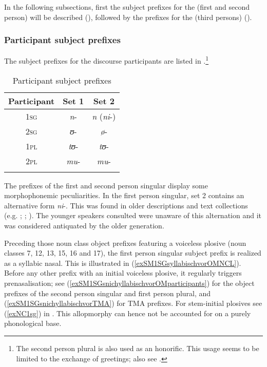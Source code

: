 In the following subsections, first the subject prefixes for the  (first and second person) will be described (), followed by the prefixes for the  (third persons) (). 
\subsubsection{Participant subject prefixes}
\label{SubjectConcordsParticipants}
The subject prefixes for the discourse participants are listed in .\footnote{The second person plural is also used as an honorific. This usage seems to be limited to the exchange of greetings; also see \citet[32]{WalshM1982}.}

\begin{table}[H]%
	\begin{center}
		\begin{tabular}{ccc}
			\lsptoprule 
			\footnotesize{Participant} & \footnotesize{Set 1} & \footnotesize{Set 2}\\ 
			\midrule 
			1\textsc{sg} & \textit{n}- & \textit{n} (\textit{ni}-) \\ 
			2\textsc{sg} & \textit{ʊ}- & \textit{ø}-\\ 
			1\textsc{pl} & \textit{tʊ}- & \textit{tʊ}-\\ 
			2\textsc{pl} & \textit{mu}- & \textit{mu}-\\
			\lspbottomrule 
		\end{tabular}
		\caption{Participant subject prefixes}
		\label{tableSMparticipants}
	\end{center}
\end{table}

The prefixes of the first and second person singular display some morphophonemic peculiarities. In the first person singular, set 2 contains an alternative form \textit{ni}-. This was found in older descriptions and text collections (e.g. \citealt{SchumannK1899}; \citealt{EndemannC1914}; \citealt{BergerP1933}). The younger speakers consulted were unaware of this alternation and it was considered antiquated by the older generation.

Preceding those noun class object prefixes featuring a voiceless plosive (noun classes 7, 12, 13, 15, 16 and 17), the first person singular subject prefix is realized as a syllabic nasal. This is illustrated in (\ref{exSM1SGsyllabischvorOMNCL}). Before any other prefix with an initial voiceless plosive, it regularly triggers prenasalisation; see (\ref{exSM1SGsnichyllabischvorOMparticipants}) for the object prefixes of the second person singular and first person plural, and (\ref{exSM1SGsnichyllabischvorTMA}) for TMA prefixes. For stem-initial plosives see (\ref{exNC1sg}) in . This allopmorphy can hence not be accounted for on a purely phonological base.

